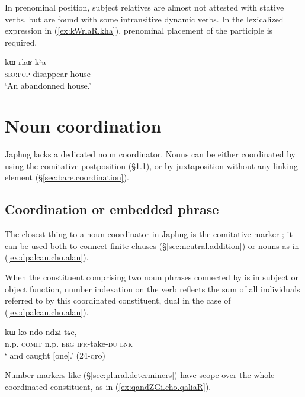 In prenominal position, subject relatives are almost not attested with stative verbs, but are found with some intransitive dynamic verbs. In the lexicalized expression in (\ref{ex:kWrlaR.kha}), prenominal placement of the participle   is required.

\begin{exe}
\ex \label{ex:kWrlaR.kha}
\gll kɯ-rlaʁ kʰa \\
\textsc{sbj}:\textsc{pcp}-disappear house \\
\glt `An abandonned house.' 
\end{exe}

 \section{Noun coordination}
Japhug lacks a dedicated noun coordinator. Nouns can be either coordinated by using the comitative postposition  (§\ref{sec:coordinator.cho}), or by  juxtaposition without any linking element (§\ref{sec:bare.coordination}). 

\subsection{Coordination or embedded phrase} \label{sec:coordinator.cho}
The closest thing to a noun coordinator in Japhug is the comitative marker ; it can be used both to connect finite clauses (§\ref{sec:neutral.addition}) or nouns as in (\ref{ex:dpalcan.cho.alan}). 

When the constituent comprising two noun phrases connected by  is in subject or object function, number indexation on the verb reflects the sum of all individuals referred to by this coordinated constituent,  dual in the case of (\ref{ex:dpalcan.cho.alan}).

 \begin{exe}
\ex \label{ex:dpalcan.cho.alan}
  kɯ ko-ndo-ndʑi tɕe, \\
 n.p. \textsc{comit} n.p. \textsc{erg} \textsc{ifr}-take-\textsc{du} \textsc{lnk} \\
 \glt ` and  caught [one].' (24-qro)
 \end{exe}
 
Number markers like  (§\ref{sec:plural.determiners}) have scope over the whole coordinated constituent, as in (\ref{ex:qandZGi.cho.qaliaR}).

